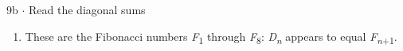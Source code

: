 \documentclass[11pt]{article}
\begin{document}
\begin{keepsection}
\begin{workedbox}{9b \ensuremath{\cdot} Read the diagonal sums}
\begin{enumerate}
\begin{equation*}{D}_{4}\, =\, 1\, +\, 3\, +\, 1\, =\, 5\end{equation*}

\begin{equation*}{D}_{5}\, =\, 1\, +\, 4\, +\, 3\, =\, 8\end{equation*}

\begin{equation*}{D}_{6}\, =\, 1\, +\, 5\, +\, 6\, +\, 1\, =\, 13\end{equation*}

\begin{equation*}{D}_{7}\, =\, 1\, +\, 6\, +\, 10\, +\, 4\, =\, 21\end{equation*}
\item These are the Fibonacci numbers \textit{F}\textsubscript{1} through \textit{F}\textsubscript{8}: \textit{D}\textsubscript{\textit{n}} appears to equal \textit{F}\textsubscript{\textit{n}+1}.
\end{enumerate}
\end{workedbox}

\end{keepsection}
\end{document}
